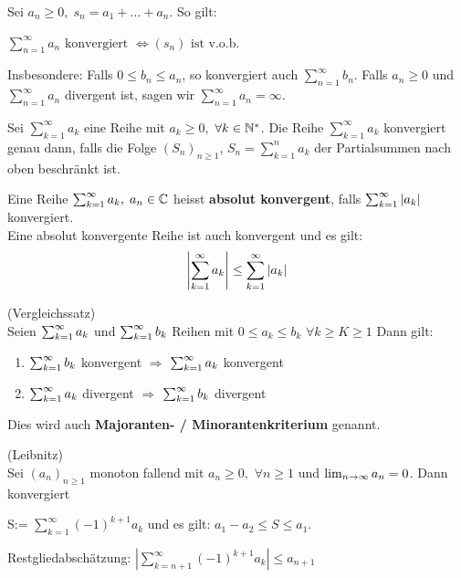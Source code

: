 \Kor Sei $a_n \geq 0,\; s_n = a_1 + \dots + a_n$. So gilt:
\vspace{-6pt}
\begin{center}
	$\sum_{n=1}^\infty a_n \text{ konvergiert } \Longleftrightarrow (s_n) \text{ ist v.o.b. }$
\end{center}
\vspace{-6pt}
Insbesondere: Falls \(0\leq b_n\leq a_n\), so konvergiert auch $\sum_{n=1}^\infty b_n$.
Falls \(a_n\geq0\) und \(\sum_{n=1}^\infty a_n\) divergent ist, sagen wir \(\sum_{n=1}^\infty a_n=\infty\).

\Satz Sei $\sum_{k=1}^{\infty} a_{k}$ eine Reihe mit $a_{k} \geq 0,$ $\forall k \in \mathbb{N}^{*}$. Die Reihe $\sum_{k=1}^{\infty} a_{k}$ konvergiert genau dann, falls die Folge $(S_{n})_{n\geq 1}$, $S_{n} = \sum_{k=1}^{n} a_{k}$
der Partialsummen nach oben beschränkt ist.



\begin{tcolorbox}
	\Def Eine Reihe $\sum_{k = 1}^{\infty} a_k, \; a_n \in \mathbb{C}$ heisst \textbf{absolut konvergent}, falls
	$\sum_{k = 1}^{\infty} |a_k|$ konvergiert. \smallskip \\
	\Satz Eine absolut konvergente Reihe ist auch konvergent und es gilt:
	\vspace{-2mm}
	$$\left| \sum_{k = 1}^{\infty} a_k \right| \leq \sum_{k = 1}^{\infty} |a_k|$$
\end{tcolorbox}



\begin{tcolorbox}
	\Kor (Vergleichssatz)\\
	Seien $\sum_{k = 1}^{\infty} a_{k}$ und $\sum_{k = 1}^{\infty} b_{k}$ Reihen mit $0 \leq a_{k} \leq b_{k}$ $\forall k \geq K \geq 1$ 
	Dann gilt:
	\begin{enumerate}[label=(\arabic*)]
		\item $\sum_{k = 1}^{\infty} b_{k}$ konvergent $\Rightarrow$  $\sum_{k = 1}^{\infty} a_{k}$ konvergent
		\item $\sum_{k = 1}^{\infty} a_{k}$ divergent $\Rightarrow$  $\sum_{k = 1}^{\infty} b_{k}$ divergent
	\end{enumerate}
	Dies wird auch \textbf{Majoranten- / Minorantenkriterium} genannt.
\end{tcolorbox}

\begin{tcolorbox}
	\Satz (Leibnitz) \\
	Sei $(a_{n})_{n\geq 1}$ monoton fallend mit $a_{n} \geq 0,$ $\forall n \geq 1$ und $\lim_{n \rightarrow \infty} a_{n} = 0$. 
	Dann konvergiert
	\vspace{-1mm}
	\begin{center}
		S:= $\sum_{k=1}^{\infty}(-1)^{k+1} a_{k}$ 
		und es gilt: \textbf{$a_{1} - a_{2} \leq S \leq a_{1}$}.
	\end{center}
	\vspace{-1mm}
	Restgliedabschätzung: $|\sum_{k= n+1}^{\infty} (-1)^{k+1} a_k| \leq a_{n+1}$
\end{tcolorbox}

